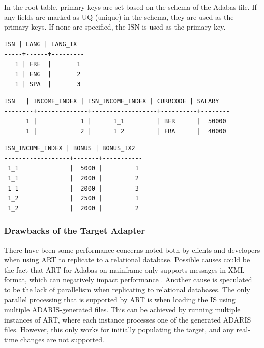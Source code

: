 In the root table, primary keys are set based on the schema of the Adabas file. If any fields are marked as UQ (unique) in the schema, they are used as the primary keys. If none are specified, the \ac{ISN} is used as the primary key.
\newpage
\begin{lstlisting}[frame=tb,caption={Query result of the MU field LANG in the relational table EMPL\_LANG},label=lst:bonusmuquery]
 ISN | LANG | LANG_IX
-----+------+---------
   1 | FRE  |       1
   1 | ENG  |       2
   1 | SPA  |       3
\end{lstlisting}

\begin{lstlisting}[frame=tb,caption={Query result of the PE field INCOME in the relational table EMPL\_INCOME},label=lst:incomepequery]
  ISN   | INCOME_INDEX | ISN_INCOME_INDEX | CURRCODE | SALARY
--------+--------------+------------------+----------+--------
      1 |            1 |      1_1         | BER      |  50000
      1 |            2 |      1_2         | FRA      |  40000
\end{lstlisting}
\begin{lstlisting}[frame=tb,caption={Query result of the MU field BONUS in the PE field INCOME in the relational table EMPL\_INCOME\_BONUS},label=lst:bonusmupequery]
 ISN_INCOME_INDEX | BONUS | BONUS_IX2
------------------+-------+-----------
 1_1              |  5000 |         1
 1_1              |  2000 |         2
 1_1              |  2000 |         3
 1_2              |  2500 |         1
 1_2              |  2000 |         2
\end{lstlisting}


\subsubsection{Drawbacks of the Target Adapter}
\label{ch02:fundamentals:adabas:art:limitations}
There have been some performance concerns noted both by clients and developers when using \ac{ART} to replicate to a relational database. Possible causes could be the fact that \ac{ART} for Adabas on mainframe only supports messages in XML format, which can negatively impact performance \cite{nicola2003xml}. Another cause is speculated to be the lack of parallelism when replicating to relational databases. The only parallel processing that is supported by \ac{ART} is when loading the \ac{IS} using multiple ADARIS-generated files. This can be achieved by running multiple instances of \ac{ART}, where each instance processes one of the generated ADARIS files. However, this only works for initially populating the target, and any real-time changes are not supported.

